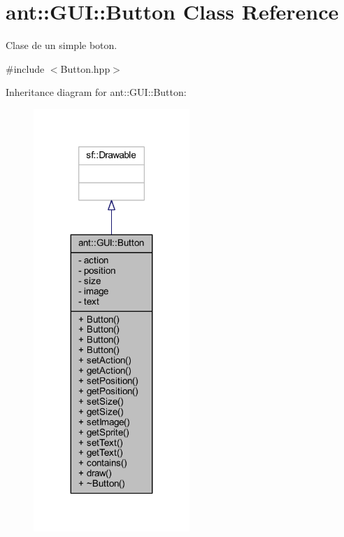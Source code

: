 \hypertarget{classant_1_1_g_u_i_1_1_button}{\section{ant\+:\+:G\+U\+I\+:\+:Button Class Reference}
\label{classant_1_1_g_u_i_1_1_button}
}


Clase de un simple boton.  




{\ttfamily \#include $<$Button.\+hpp$>$}



Inheritance diagram for ant\+:\+:G\+U\+I\+:\+:Button\+:
\nopagebreak
\begin{figure}[H]
\begin{center}
\leavevmode
\includegraphics[width=167pt]{df/d91/classant_1_1_g_u_i_1_1_button__inherit__graph}
\end{center}
\end{figure}


